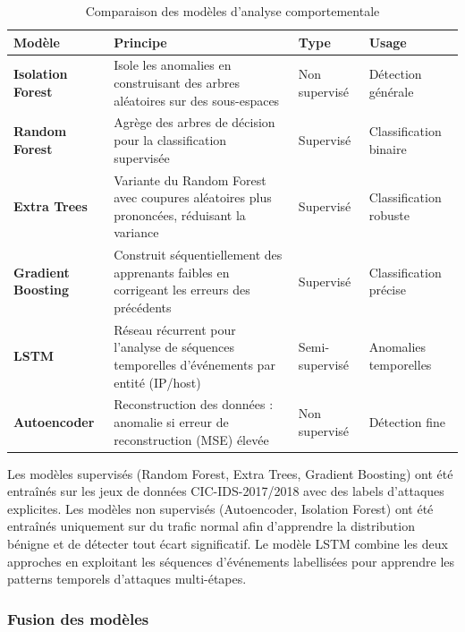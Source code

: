 \documentclass[12pt,a4paper,oneside]{report}
\begin{document}
	\begin{table}[h!]
		\centering
		\caption{Comparaison des modèles d'analyse comportementale}
		\begin{tabular}{|l|p{5cm}|l|p{4cm}|}
			\hline
			\textbf{Modèle} & \textbf{Principe} & \textbf{Type} & \textbf{Usage} \\
			\hline
			
			\textbf{Isolation Forest} & Isole les anomalies en construisant des arbres aléatoires sur des sous-espaces & Non supervisé & Détection générale \\
			\hline
			
			\textbf{Random Forest} & Agrège des arbres de décision pour la classification supervisée & Supervisé & Classification binaire \\
			\hline
			
			\textbf{Extra Trees} & Variante du Random Forest avec coupures aléatoires plus prononcées, réduisant la variance & Supervisé & Classification robuste \\
			\hline
			
			\textbf{Gradient Boosting} & Construit séquentiellement des apprenants faibles en corrigeant les erreurs des précédents & Supervisé & Classification précise \\
			\hline
			
			\textbf{LSTM} & Réseau récurrent pour l'analyse de séquences temporelles d'événements par entité (IP/host) & Semi-supervisé & Anomalies temporelles \\
			\hline
			
			\textbf{Autoencoder} & Reconstruction des données : anomalie si erreur de reconstruction (MSE) élevée & Non supervisé & Détection fine \\
			\hline
			
		\end{tabular}
	\end{table}
	
	Les modèles supervisés (Random Forest, Extra Trees, Gradient Boosting) ont été entraînés sur les jeux de données CIC-IDS-2017/2018 avec des labels d'attaques explicites. Les modèles non supervisés (Autoencoder, Isolation Forest) ont été entraînés uniquement sur du trafic normal afin d'apprendre la distribution bénigne et de détecter tout écart significatif. Le modèle LSTM combine les deux approches en exploitant les séquences d'événements labellisées pour apprendre les patterns temporels d'attaques multi-étapes.
	
	\subsubsection{Fusion des modèles}
	
\end{document}

